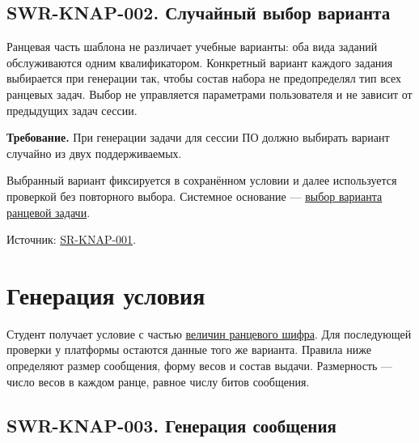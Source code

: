 \documentclass[12pt,a4paper]{article}
\begin{document}
\subsection{SWR-KNAP-002. Случайный выбор варианта}\label{swr-knap-002-ux441ux43bux443ux447ux430ux439ux43dux44bux439-ux432ux44bux431ux43eux440-ux432ux430ux440ux438ux430ux43dux442ux430}

\hypertarget{swr-knap-002-случайный-выбор-варианта}{}

\hypertarget{swr-knap-002}{}

Ранцевая часть шаблона не различает учебные варианты: оба вида заданий обслуживаются одним квалификатором. Конкретный вариант каждого задания выбирается при генерации так, чтобы состав набора не предопределял тип всех ранцевых задач. Выбор не управляется параметрами пользователя и не зависит от предыдущих задач сессии.

\textbf{Требование.} При генерации задачи для сессии ПО должно выбирать вариант случайно из двух поддерживаемых.

Выбранный вариант фиксируется в сохранённом условии и далее используется проверкой без повторного выбора. Системное основание --- {\href{../04\_Системные\_требования/DOC-05\_Системные\_требования.pdf\#sr-knap-001-выбор-варианта-ранцевой-задачи}{выбор варианта ранцевой задачи}}.

Источник: {\href{../04\_Системные\_требования/DOC-05\_Системные\_требования.pdf\#sr-knap-001}{SR-KNAP-001}}.

\section{Генерация условия}\label{3-ux433ux435ux43dux435ux440ux430ux446ux438ux44f-ux443ux441ux43bux43eux432ux438ux44f}

\hypertarget{3-генерация-условия}{}

Студент получает условие с частью {\hyperlink{как-устроена-ранцевая-задача}{величин ранцевого шифра}}. Для последующей проверки у платформы остаются данные того же варианта. Правила ниже определяют размер сообщения, форму весов и состав выдачи. Размерность --- число весов в каждом ранце, равное числу битов сообщения.

\subsection{SWR-KNAP-003. Генерация сообщения}\label{swr-knap-003-ux433ux435ux43dux435ux440ux430ux446ux438ux44f-ux441ux43eux43eux431ux449ux435ux43dux438ux44f}
\end{document}
